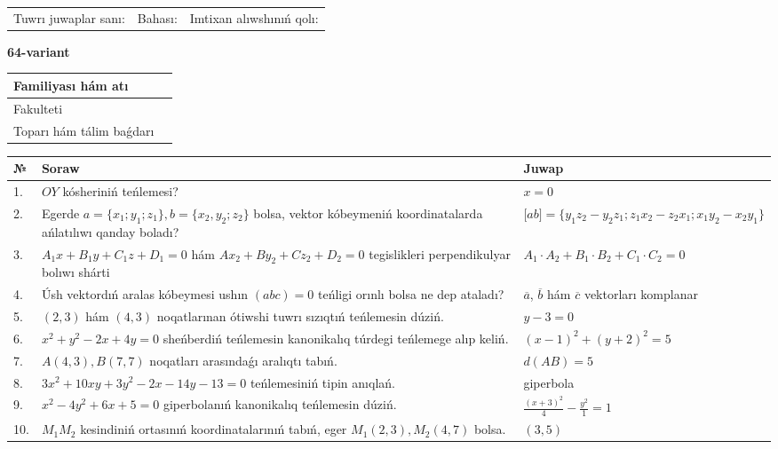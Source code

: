 \documentclass{article}
\begin{document}
\vspace{1cm}

\begin{tabular}{lll}
Tuwrı juwaplar sanı: \underline{\hspace{1.5cm}} & 
Bahası: \underline{\hspace{1.5cm}} & 
Imtixan alıwshınıń qolı: \underline{\hspace{2cm}} \\
\end{tabular}

\egroup

\newpage


\textbf{64-variant}\\

\bgroup
\def\arraystretch{1.6} %

\begin{tabular}{|m{5.7cm}|m{9.5cm}|}
\hline
Familiyası hám atı & \\
\hline
Fakulteti  & \\
\hline
Toparı hám tálim baǵdarı  & \\
\hline
\end{tabular}

\vspace{1cm}

\begin{tabular}{|m{0.7cm}|m{10cm}|m{4cm}|}
\hline
№ & Soraw & Juwap \\
\hline
1. & $OY$ kósheriniń teńlemesi? & $x=0$ \\
\hline
2. & Egerde $a=\{ x_1; y_1; z_1\}, b=\{ x_2, y_2; z_2\}$ bolsa, vektor kóbeymeniń koordinatalarda ańlatılıwı qanday boladı? &  $\lbrack ab\rbrack=\{y_1z_2-y_2z_1; z_1x_2-z_2x_1; x_1y_2-x_2y_1\}$ \\
\hline
3. & $A_1x+B_1y+C_1z+D_1=0$ hám $Ax_2+By_2+Cz_2+D_2=0$ tegislikleri perpendikulyar bolıwı shárti & $A_1\cdot A_2+B_1\cdot B_2+C_1\cdot C_2=0$ \\
\hline
4. & Úsh vektordıń aralas kóbeymesi ushın $(abc)=0$ teńligi orınlı bolsa ne dep ataladı? & $\overline{a}$, $\overline{b}$ hám $\overline{c}$ vektorları komplanar \\
\hline
5. & $(2, 3)$ hám $(4, 3)$ noqatlarınan ótiwshi tuwrı sızıqtıń teńlemesin dúziń. & $ y-3=0$ \\
\hline
6. & $x^{2}+y^{2}-2x+4y=0$ sheńberdiń teńlemesin kanonikalıq túrdegi teńlemege alıp keliń. & $(x-1)^{2}+(y+2)^{2}=5$ \\
\hline
7. & $A(4, 3), B(7, 7)$ noqatları arasındaǵı aralıqtı tabıń. & $d(AB)=5$ \\
\hline
8. & $3x^{2}+10xy+3y^{2}-2x-14y-13=0$ teńlemesiniń tipin anıqlań. & giperbola \\
\hline
9. & $x^{2}-4y^{2}+6x+5=0$ giperbolanıń kanonikalıq teńlemesin dúziń. & $\frac{(x+3)^{2}}{4}-\frac{y^{2}}{1}=1$ \\
\hline
10. & $M_{1}M_{2}$ kesindiniń ortasınıń koordinatalarınıń tabıń, eger $M_{1} (2, 3), M_{2} (4, 7)$ bolsa. & $(3,5)$ \\
\hline
\end{tabular}
\end{document}
